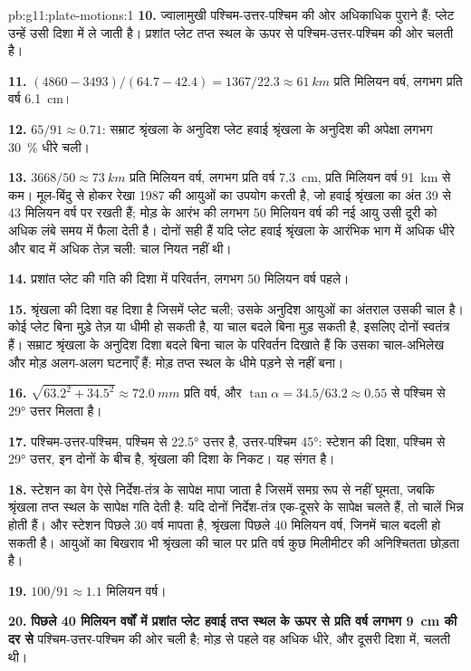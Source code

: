 \begin{solution}{pb:g11:plate-motions:1}
\textbf{10.} ज्वालामुखी पश्चिम-उत्तर-पश्चिम की ओर अधिकाधिक पुराने हैं:
प्लेट उन्हें उसी दिशा में ले जाती है। प्रशांत प्लेट तप्त स्थल के ऊपर से
पश्चिम-उत्तर-पश्चिम की ओर चलती है।

\textbf{11.} $(4860 - 3493)/(64.7 - 42.4) = 1367/22.3 \approx \qty{61}{km}$
प्रति मिलियन वर्ष, लगभग प्रति वर्ष \qty{6.1}{cm}।

\textbf{12.} $65/91 \approx 0.71$: सम्राट श्रृंखला के अनुदिश प्लेट
हवाई श्रृंखला के अनुदिश की अपेक्षा लगभग \qty{30}{\percent} धीरे चली।

\textbf{13.} $3668/50 \approx \qty{73}{km}$ प्रति मिलियन वर्ष, लगभग
प्रति वर्ष \qty{7.3}{cm}, प्रति मिलियन वर्ष \qty{91}{km} से कम। मूल-बिंदु से होकर रेखा
1987 की आयुओं का उपयोग करती है, जो हवाई श्रृंखला का अंत 39 से 43
मिलियन वर्ष पर रखती हैं; मोड़ के आरंभ की लगभग 50 मिलियन वर्ष की नई आयु
उसी दूरी को अधिक लंबे समय में फैला देती है। दोनों सही हैं यदि प्लेट
हवाई श्रृंखला के आरंभिक भाग में अधिक धीरे और बाद में अधिक तेज़ चली:
चाल नियत नहीं थी।

\textbf{14.} प्रशांत प्लेट की गति की दिशा में परिवर्तन, लगभग
50 मिलियन वर्ष पहले।

\textbf{15.} श्रृंखला की दिशा वह दिशा है जिसमें प्लेट
चली; उसके अनुदिश आयुओं का अंतराल उसकी चाल है। कोई प्लेट बिना मुड़े तेज़ या
धीमी हो सकती है, या चाल बदले बिना मुड़ सकती है, इसलिए दोनों
स्वतंत्र हैं। सम्राट
श्रृंखला के अनुदिश दिशा बदले बिना चाल के परिवर्तन दिखाते हैं कि उसका चाल-अभिलेख और मोड़
अलग-अलग घटनाएँ हैं: मोड़ तप्त स्थल के धीमे पड़ने से नहीं बना।

\textbf{16.} $\sqrt{63.2^2 + 34.5^2} \approx \qty{72.0}{mm}$ प्रति वर्ष, और
$\tan\alpha = 34.5/63.2 \approx 0.55$ से पश्चिम से \ang{29} उत्तर मिलता है।

\textbf{17.} पश्चिम-उत्तर-पश्चिम, पश्चिम से \ang{22.5} उत्तर है, उत्तर-पश्चिम
\ang{45}: स्टेशन की दिशा, पश्चिम से \ang{29} उत्तर, इन दोनों के बीच है,
श्रृंखला की दिशा के निकट। यह संगत है।

\textbf{18.} स्टेशन का वेग ऐसे निर्देश-तंत्र के सापेक्ष मापा जाता है जिसमें
 समग्र रूप से नहीं घूमता, जबकि श्रृंखला तप्त स्थल के सापेक्ष
गति देती है: यदि दोनों निर्देश-तंत्र एक-दूसरे के सापेक्ष चलते हैं,
तो चालें भिन्न होती हैं। और स्टेशन पिछले 30 वर्ष मापता है,
श्रृंखला पिछले 40 मिलियन वर्ष, जिनमें चाल बदली हो सकती है।
आयुओं का बिखराव भी श्रृंखला की चाल पर प्रति वर्ष कुछ मिलीमीटर की
अनिश्चितता छोड़ता है।

\textbf{19.} $100/91 \approx 1.1$ मिलियन वर्ष।

\textbf{20.} \textbf{पिछले 40 मिलियन वर्षों में प्रशांत प्लेट हवाई तप्त स्थल के ऊपर से
प्रति वर्ष लगभग \qty{9}{cm} की दर से} पश्चिम-उत्तर-पश्चिम की ओर चली है;
मोड़ से पहले वह अधिक धीरे, और दूसरी दिशा में, चलती थी।
\end{solution}
